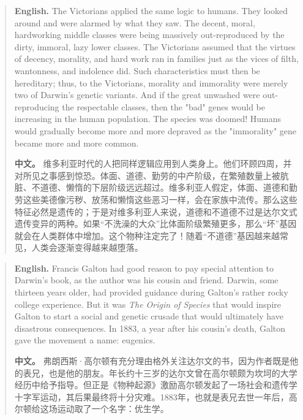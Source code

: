 \begin{quote}
\noindent\textbf{English.} The Victorians applied the same logic to humans. They looked around and were alarmed by what they saw. The decent, moral, hardworking middle classes were being massively out-reproduced by the dirty, immoral, lazy lower classes. The Victorians assumed that the virtues of decency, morality, and hard work ran in families just as the vices of filth, wantonness, and indolence did. Such characteristics must then be hereditary; thus, to the Victorians, morality and immorality were merely two of Darwin's genetic variants. And if the great unwashed were out-reproducing the respectable classes, then the "bad" genes would be increasing in the human population. The species was doomed! Humans would gradually become more and more depraved as the "immorality" gene became more and more common.

\smallskip
\noindent\textbf{中文。} 维多利亚时代的人把同样逻辑应用到人类身上。他们环顾四周，并对所见之事感到惊恐。体面、道德、勤劳的中产阶级，在繁殖数量上被肮脏、不道德、懒惰的下层阶级远远超过。维多利亚人假定，体面、道德和勤劳这些美德像污秽、放荡和懒惰这些恶习一样，会在家族中流传。那么这些特征必然是遗传的；于是对维多利亚人来说，道德和不道德不过是达尔文式遗传变异的两种。如果“不洗澡的大众”比体面阶级繁殖更多，那么“坏”基因就会在人类群体中增加。这个物种注定完了！随着“不道德”基因越来越常见，人类会逐渐变得越来越堕落。
\end{quote}

\begin{quote}
\noindent\textbf{English.} Francis Galton had good reason to pay special attention to Darwin's book, as the author was his cousin and friend. Darwin, some thirteen years older, had provided guidance during Galton's rather rocky college experience. But it was \emph{The Origin of Species} that would inspire Galton to start a social and genetic crusade that would ultimately have disastrous consequences. In 1883, a year after his cousin's death, Galton gave the movement a name: eugenics.

\smallskip
\noindent\textbf{中文。} 弗朗西斯·高尔顿有充分理由格外关注达尔文的书，因为作者既是他的表兄，也是他的朋友。年长约十三岁的达尔文曾在高尔顿颇为坎坷的大学经历中给予指导。但正是《物种起源》激励高尔顿发起了一场社会和遗传学十字军运动，其后果最终将十分灾难。1883年，也就是表兄去世一年后，高尔顿给这场运动取了一个名字：优生学。
\end{quote}

